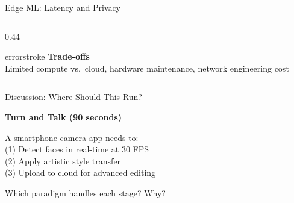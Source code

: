 \documentclass[aspectratio=169, 12pt]{beamer}
\begin{document}
\begin{frame}{Edge ML: Latency and Privacy}
\begin{columns}[T]
\begin{column}{0.44\textwidth}
    \vspace{0.15cm}
    \begin{mlsyscard}{errorstroke}
    \textbf{Trade-offs}\\
    {\footnotesize Limited compute vs.\ cloud, hardware maintenance, network engineering cost}
    \end{mlsyscard}
  \end{column}
\end{columns}

\end{frame}

\begin{frame}{Discussion: Where Should This Run?}
\note{
%
%
%
%
}

\centering
\vspace{0.4cm}
{\large\bfseries Turn and Talk \textcolor{midgray}{(90 seconds)}}

\vspace{0.3cm}
{\large A smartphone camera app needs to:\\[0.1cm]
(1) Detect faces in real-time at 30 FPS\\
(2) Apply artistic style transfer\\
(3) Upload to cloud for advanced editing}

\vspace{0.25cm}
\alert{Which paradigm handles each stage? Why?}


\end{frame}
\end{document}
